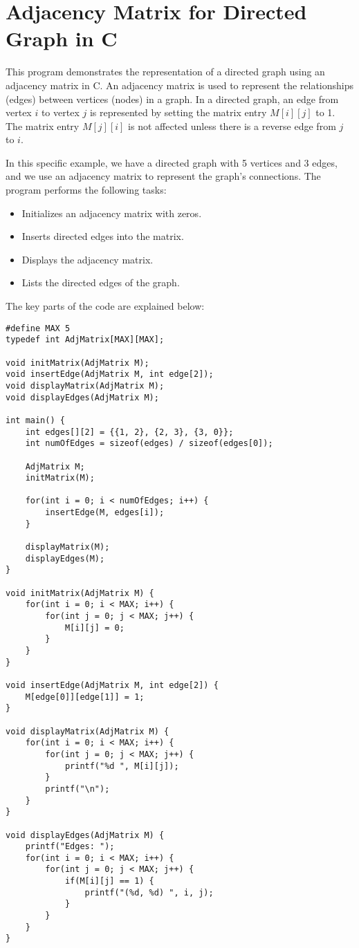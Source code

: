 \documentclass{book}
\begin{document}
\section{Adjacency Matrix for Directed Graph in C}
This program demonstrates the representation of a directed graph using an adjacency matrix in C. An adjacency matrix is used to represent the relationships (edges) between vertices (nodes) in a graph. In a directed graph, an edge from vertex \( i \) to vertex \( j \) is represented by setting the matrix entry \( M[i][j] \) to 1. The matrix entry \( M[j][i] \) is not affected unless there is a reverse edge from \( j \) to \( i \).

In this specific example, we have a directed graph with 5 vertices and 3 edges, and we use an adjacency matrix to represent the graph's connections. The program performs the following tasks:
\begin{itemize}
    \item Initializes an adjacency matrix with zeros.
    \item Inserts directed edges into the matrix.
    \item Displays the adjacency matrix.
    \item Lists the directed edges of the graph.
\end{itemize}

The key parts of the code are explained below:

\begin{verbatim}
#define MAX 5
typedef int AdjMatrix[MAX][MAX];

void initMatrix(AdjMatrix M);
void insertEdge(AdjMatrix M, int edge[2]);
void displayMatrix(AdjMatrix M);
void displayEdges(AdjMatrix M);

int main() {
    int edges[][2] = {{1, 2}, {2, 3}, {3, 0}};
    int numOfEdges = sizeof(edges) / sizeof(edges[0]);
    
    AdjMatrix M;
    initMatrix(M);

    for(int i = 0; i < numOfEdges; i++) {
        insertEdge(M, edges[i]);
    }

    displayMatrix(M);
    displayEdges(M);
}

void initMatrix(AdjMatrix M) {
    for(int i = 0; i < MAX; i++) {
        for(int j = 0; j < MAX; j++) {
            M[i][j] = 0;
        }
    }
}

void insertEdge(AdjMatrix M, int edge[2]) {
    M[edge[0]][edge[1]] = 1;
}

void displayMatrix(AdjMatrix M) {
    for(int i = 0; i < MAX; i++) {
        for(int j = 0; j < MAX; j++) {
            printf("%d ", M[i][j]);
        }
        printf("\n");
    }
}

void displayEdges(AdjMatrix M) {
    printf("Edges: ");
    for(int i = 0; i < MAX; i++) {
        for(int j = 0; j < MAX; j++) {
            if(M[i][j] == 1) {
                printf("(%d, %d) ", i, j);
            }
        }
    }
}
\end{verbatim}
\end{document}
